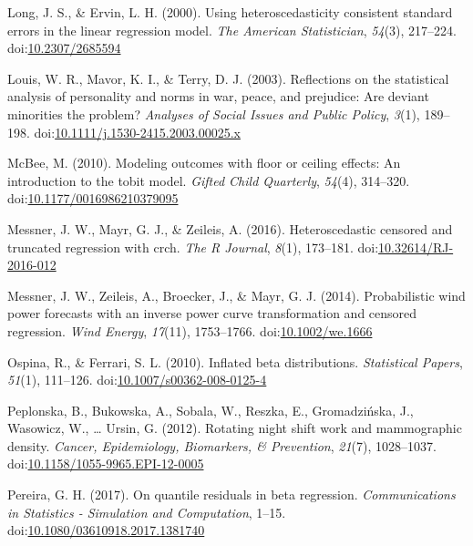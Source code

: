 \documentclass[english,,man]{apa6}
\begin{document}
\leavevmode\hypertarget{ref-long2000using}{}%
Long, J. S., \& Ervin, L. H. (2000). Using heteroscedasticity consistent standard errors in the linear regression model. \emph{The American Statistician}, \emph{54}(3), 217--224. doi:\href{https://doi.org/10.2307/2685594}{10.2307/2685594}

\leavevmode\hypertarget{ref-louis2003reflections}{}%
Louis, W. R., Mavor, K. I., \& Terry, D. J. (2003). Reflections on the statistical analysis of personality and norms in war, peace, and prejudice: Are deviant minorities the problem? \emph{Analyses of Social Issues and Public Policy}, \emph{3}(1), 189--198. doi:\href{https://doi.org/10.1111/j.1530-2415.2003.00025.x}{10.1111/j.1530-2415.2003.00025.x}

\leavevmode\hypertarget{ref-mcbee2010modeling}{}%
McBee, M. (2010). Modeling outcomes with floor or ceiling effects: An introduction to the tobit model. \emph{Gifted Child Quarterly}, \emph{54}(4), 314--320. doi:\href{https://doi.org/10.1177/0016986210379095}{10.1177/0016986210379095}

\leavevmode\hypertarget{ref-messner2016heteroscedastic}{}%
Messner, J. W., Mayr, G. J., \& Zeileis, A. (2016). Heteroscedastic censored and truncated regression with crch. \emph{The R Journal}, \emph{8}(1), 173--181. doi:\href{https://doi.org/10.32614/RJ-2016-012}{10.32614/RJ-2016-012}

\leavevmode\hypertarget{ref-messner2014probabilistic}{}%
Messner, J. W., Zeileis, A., Broecker, J., \& Mayr, G. J. (2014). Probabilistic wind power forecasts with an inverse power curve transformation and censored regression. \emph{Wind Energy}, \emph{17}(11), 1753--1766. doi:\href{https://doi.org/10.1002/we.1666}{10.1002/we.1666}

\leavevmode\hypertarget{ref-ospina2010inflated}{}%
Ospina, R., \& Ferrari, S. L. (2010). Inflated beta distributions. \emph{Statistical Papers}, \emph{51}(1), 111--126. doi:\href{https://doi.org/10.1007/s00362-008-0125-4}{10.1007/s00362-008-0125-4}

\leavevmode\hypertarget{ref-peplonska2012rotating}{}%
Peplonska, B., Bukowska, A., Sobala, W., Reszka, E., Gromadzińska, J., Wasowicz, W., \ldots{} Ursin, G. (2012). Rotating night shift work and mammographic density. \emph{Cancer, Epidemiology, Biomarkers, \& Prevention}, \emph{21}(7), 1028--1037. doi:\href{https://doi.org/10.1158/1055-9965.EPI-12-0005}{10.1158/1055-9965.EPI-12-0005}

\leavevmode\hypertarget{ref-pereira2017quantile}{}%
Pereira, G. H. (2017). On quantile residuals in beta regression. \emph{Communications in Statistics - Simulation and Computation}, 1--15. doi:\href{https://doi.org/10.1080/03610918.2017.1381740}{10.1080/03610918.2017.1381740}
\end{document}
